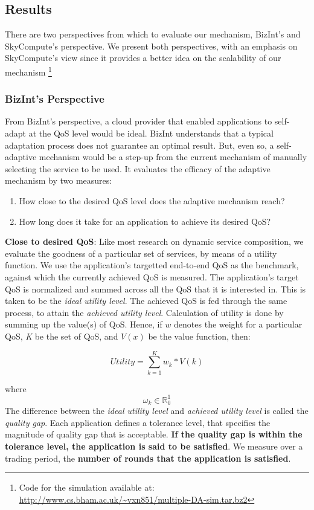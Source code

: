 \documentclass[10pt,journal,compsoc]{IEEEtran}
\begin{document}
\subsection{Results}
There are two perspectives from which to evaluate our mechanism, BizInt's and SkyCompute's perspective. We present both perspectives, with an emphasis on SkyCompute's view since it provides a better idea on the scalability of our mechanism \footnote{Code for the simulation available at: \url{http://www.cs.bham.ac.uk/~vxn851/multiple-DA-sim.tar.bz2}}\\
\subsubsection{BizInt's Perspective}
From BizInt's perspective, a cloud provider that enabled applications to self-adapt at the QoS level would be ideal. BizInt understands that a typical adaptation process does not guarantee an optimal result. But, even so, a self-adaptive mechanism would be a step-up from the current mechanism of manually selecting the service to be used. It evaluates the efficacy of the adaptive mechanism by two measures:
	\begin{enumerate}
		\item How close to the desired QoS level does the adaptive mechanism reach?
		\item How long does it take for an application to achieve its desired QoS?
	\end{enumerate}
\textbf{Close to desired QoS}: Like most research on dynamic service composition, we evaluate the goodness of a particular set of services, by means of a utility function. We use the application's targetted end-to-end QoS as the benchmark, against which the currently achieved QoS is measured. The application's target QoS is normalized and summed across all the QoS that it is interested in. This is taken to be the \textit{ideal utility level}. The achieved QoS is fed through the same process, to attain the \textit{achieved utility level}. Calculation of utility is done by summing up the value(s) of QoS.  Hence, if $w$ denotes the weight for a particular QoS, \textsl{K} be the set of QoS, and $V(x)$ be the value function, then:
	 
	  \begin{equation}
	    Utility = \sum_{k=1}^K w_{k} * V(k) \label{eqn:sum_of_weights}
	  \end{equation}

	  where 
	  \begin{displaymath}
	   \omega_{k} \in \mathbb{R}_{0}^{1}
	  \end{displaymath}
The difference between the \textit{ideal utility level} and \textit{achieved utility level} is called the \textit{quality gap}. Each application defines a tolerance level, that specifies the magnitude of quality gap that is acceptable. \textbf{If the quality gap is within the tolerance level, the application is said to be satisfied}. We measure over a trading period, the \textbf{number of rounds that the application is satisfied}.\\
\end{document}
